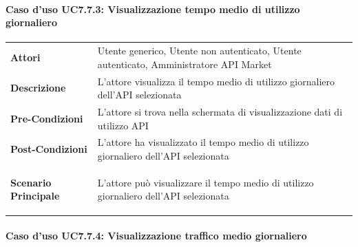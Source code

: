 \paragraph{Caso d'uso UC7.7.3: Visualizzazione tempo medio di utilizzo giornaliero}
\label{UC7_7.3}

\begin{minipage}{\linewidth}
	\begin{tabular}{ l | p{11cm}}
		\hline
		\rowcolor{Gray}
		\multicolumn{2}{c}{UC7.7.3 - Visualizzazione tempo medio di utilizzo giornaliero} \\
		\hline
		\textbf{Attori} & Utente generico, Utente non autenticato, Utente autenticato, Amministratore API Market \\
		\textbf{Descrizione} & L'attore visualizza il tempo medio di utilizzo giornaliero dell'API selezionata \\
		\textbf{Pre-Condizioni} & L'attore si trova nella schermata di visualizzazione dati di utilizzo API \\
		\textbf{Post-Condizioni} & L'attore ha visualizzato il tempo medio di utilizzo giornaliero dell'API selezionata \\
		\textbf{Scenario Principale} & 
		\begin{enumerate*}[label=(\arabic*.),itemjoin={\newline}]
			\item L'attore può visualizzare il tempo medio di utilizzo giornaliero dell'API selezionata
		\end{enumerate*}\\
	\end{tabular}
\end{minipage}

\paragraph{Caso d'uso UC7.7.4: Visualizzazione traffico medio giornaliero}
\label{UC7_7.4}

